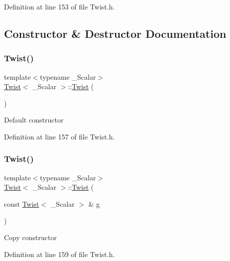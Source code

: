 Definition at line 153 of file Twist.\+h.



\subsection{Constructor \& Destructor Documentation}
\hypertarget{class_twist_a1591bb5cbaf556a1315950e4b27a50cf}{}\label{class_twist_a1591bb5cbaf556a1315950e4b27a50cf} 
\subsubsection{\texorpdfstring{Twist()}{Twist()}\hspace{0.1cm}{\footnotesize\ttfamily [1/7]}}
{\footnotesize\ttfamily template$<$typename \+\_\+\+Scalar$>$ \\
\hyperlink{class_twist}{Twist}$<$ \+\_\+\+Scalar $>$\+::\hyperlink{class_twist}{Twist} (\begin{DoxyParamCaption}{ }\end{DoxyParamCaption})\hspace{0.3cm}{\ttfamily [inline]}}

Default constructor 

Definition at line 157 of file Twist.\+h.

\hypertarget{class_twist_a6d27b4287aff94955d46b3f76151f119}{}\label{class_twist_a6d27b4287aff94955d46b3f76151f119} 
\subsubsection{\texorpdfstring{Twist()}{Twist()}\hspace{0.1cm}{\footnotesize\ttfamily [2/7]}}
{\footnotesize\ttfamily template$<$typename \+\_\+\+Scalar$>$ \\
\hyperlink{class_twist}{Twist}$<$ \+\_\+\+Scalar $>$\+::\hyperlink{class_twist}{Twist} (\begin{DoxyParamCaption}\item[{const \hyperlink{class_twist}{Twist}$<$ \+\_\+\+Scalar $>$ \&}]{g }\end{DoxyParamCaption})\hspace{0.3cm}{\ttfamily [inline]}}

Copy constructor 

Definition at line 159 of file Twist.\+h.

\hypertarget{class_twist_a4b460b4e069b959f7fd2f0d01fdf4703}{}\label{class_twist_a4b460b4e069b959f7fd2f0d01fdf4703} 
